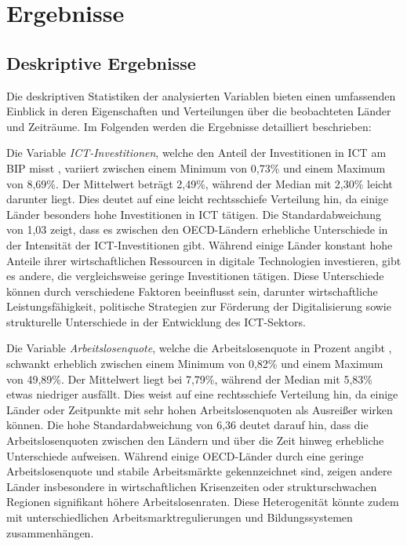 
\section{Ergebnisse}


\subsection{Deskriptive Ergebnisse}

Die deskriptiven Statistiken der analysierten Variablen bieten einen umfassenden Einblick 
in deren Eigenschaften und Verteilungen über die beobachteten Länder und Zeiträume. Im 
Folgenden werden die Ergebnisse detailliert beschrieben:



Die Variable \textit{\ac{ICT}-Investitionen}, welche den Anteil der Investitionen in 
\ac{ICT} am \ac{BIP} misst \parencite{oecd2022ict}, variiert zwischen einem Minimum von 
0,73\% und einem Maximum von 8,69\%. Der Mittelwert beträgt 2,49\%, während der Median mit 
2,30\% leicht darunter liegt. Dies deutet auf eine leicht rechtsschiefe Verteilung hin, 
da einige Länder besonders hohe Investitionen in \ac{ICT} tätigen. Die Standardabweichung 
von 1,03 zeigt, dass es zwischen den OECD-Ländern erhebliche Unterschiede in der Intensität 
der \ac{ICT}-Investitionen gibt. Während einige Länder konstant hohe Anteile ihrer 
wirtschaftlichen Ressourcen in digitale Technologien investieren, gibt es andere, die 
vergleichsweise geringe Investitionen tätigen. Diese Unterschiede können durch verschiedene 
Faktoren beeinflusst sein, darunter wirtschaftliche Leistungsfähigkeit, politische 
Strategien zur Förderung der Digitalisierung sowie strukturelle Unterschiede in der 
Entwicklung des \ac{ICT}-Sektors.

Die Variable \textit{Arbeitslosenquote}, welche die Arbeitslosenquote in Prozent angibt 
\parencite{oecd2022unemployment}, schwankt erheblich zwischen einem Minimum von 0,82\% und 
einem Maximum von 49,89\%. Der Mittelwert liegt bei 7,79\%, während der Median mit 5,83\% 
etwas niedriger ausfällt. Dies weist auf eine rechtsschiefe Verteilung hin, da einige 
Länder oder Zeitpunkte mit sehr hohen Arbeitslosenquoten als Ausreißer wirken können. Die 
hohe Standardabweichung von 6,36 deutet darauf hin, dass die Arbeitslosenquoten 
zwischen den Ländern und über die Zeit hinweg erhebliche Unterschiede aufweisen. Während 
einige OECD-Länder durch eine geringe Arbeitslosenquote und stabile Arbeitsmärkte 
gekennzeichnet sind, zeigen andere Länder insbesondere in wirtschaftlichen Krisenzeiten 
oder strukturschwachen Regionen signifikant höhere Arbeitslosenraten. Diese Heterogenität 
könnte zudem mit unterschiedlichen Arbeitsmarktregulierungen und Bildungssystemen 
zusammenhängen.

